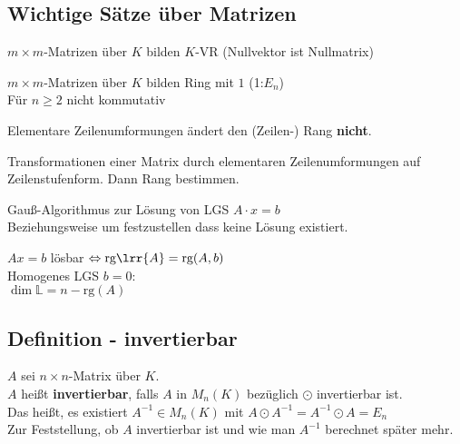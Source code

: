 \subsection{Wichtige Sätze über Matrizen}
		\item $m\times m$-Matrizen über $K$ bilden $K$-VR (Nullvektor ist Nullmatrix)
		\item $m\times m$-Matrizen über $K$ bilden Ring mit $1$ (1:$E_n$)\\
			Für $n\geq 2$ nicht kommutativ
		\item Elementare Zeilenumformungen ändert den (Zeilen-) Rang \textbf{nicht}.
		\item Transformationen einer Matrix durch elementaren Zeilenumformungen auf \\
			Zeilenstufenform. Dann Rang bestimmen.
		\item Gauß-Algorithmus zur Lösung von LGS $A\cdot x=b$\\
			Beziehungsweise um festzustellen dass keine Lösung existiert.
		\item $Ax=b$ lösbar $\Leftrightarrow \mbox{rg}\lrr{A}=\mbox{rg}(A,b)$\\
			Homogenes LGS $b=0$:\\
			$\dim\mathbb{L}=n-\mbox{rg}(A)$
	\subExEnd
	
\subsection{Definition - invertierbar}
	$A$ sei $n\times n$-Matrix über $K$.\\
	$A$ heißt \textbf{invertierbar}, falls $A$ in $M_n(K)$ bezüglich $\odot$ invertierbar ist.\\
	Das heißt, es existiert $A^{-1}\in M_n(K)$ mit $A\odot A^{-1}=A^{-1}\odot A=E_n$\\
	Zur Feststellung, ob $A$ invertierbar ist und wie man $A^{-1}$ berechnet später mehr.
